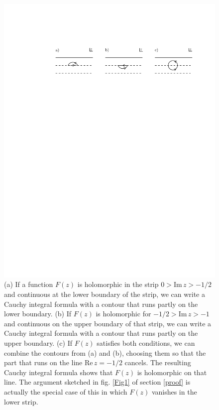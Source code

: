 \documentclass[12pt]{article}
\numberwithin{equation}{section}
\begin{document}
\begin{appendix}
 \begin{figure}
 \begin{center}
   \includegraphics[width=6.5in]{Fig6.pdf}
 \end{center}
\caption{\small (a) If a function $F(z)$ is holomorphic in the strip $0>\mathrm{Im}\,z>-1/2$ and continuous
at the lower boundary of the strip, we can write a Cauchy integral formula with a contour that runs partly on the lower
boundary.  (b) If $F(z)$ is holomorphic for $-1/2>\mathrm{Im}\,z>-1$ and continuous on the upper
boundary of that strip, we can write a Cauchy integral formula with a contour that runs partly on the upper boundary.
(c) If $F(z)$ satisfies both conditions, we can combine the contours  from (a) and (b), choosing
them so that the part that runs on the line $\mathrm{Re}\,z=-1/2$ cancels.  The resulting Cauchy integral
formula shows that $F(z)$ is holomorphic on that line.  The argument sketched in fig. \ref{Fig1} of section \ref{proof}  is actually
the special case of this in which $F(z)$ vanishes in the lower strip.  \label{Fig6}}
\end{figure}
 


\end{appendix}
\end{document}
